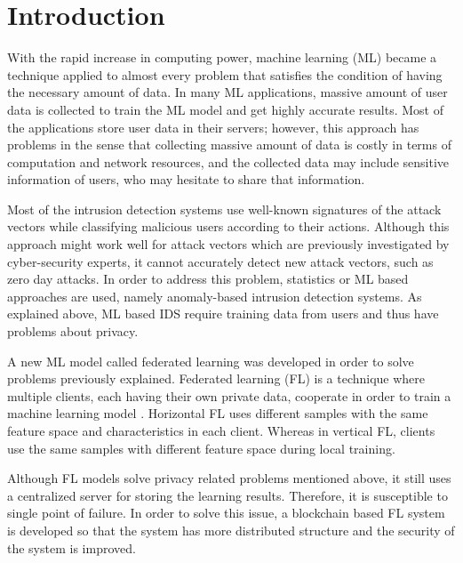 
\section{Introduction}
With the rapid increase in computing power, machine learning (ML) became a technique applied to almost every problem that satisfies the condition of having the necessary amount of data. In many ML applications, massive amount of user data is collected to train the ML model and get highly accurate results. Most of the applications store user data in their servers; however, this approach has problems in the sense that collecting massive amount of data is costly in terms of computation and network resources, and the collected data may include sensitive information of users, who may hesitate to share that information.

Most of the intrusion detection systems use well-known signatures of the attack vectors while classifying malicious users according to their actions. Although this approach might work well for attack vectors which are previously investigated by cyber-security experts, it cannot accurately detect new attack vectors, such as zero day attacks. In order to address this problem, statistics or ML based approaches are used, namely anomaly-based intrusion detection systems. As explained above, ML based IDS require training data from users and thus have problems about privacy.

A new ML model called federated learning was developed in order to solve problems previously explained. Federated learning (FL) is a technique where multiple clients, each having their own private data, cooperate in order to train a machine learning model \citep{bcflsurvey}.
Horizontal FL uses different samples with the same feature space and characteristics in each client.
Whereas in vertical FL, clients use the same samples with different feature space during local training.

Although FL models solve privacy related problems mentioned above, it still uses a centralized server for storing the learning results. Therefore, it is susceptible to single point of failure. In order to solve this issue, a blockchain based FL system is developed so that the system has more distributed structure and the security of the system is improved.